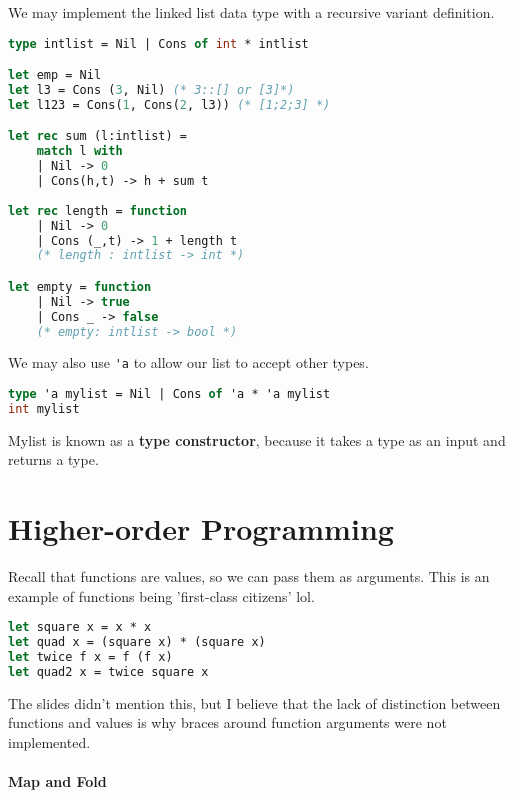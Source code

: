 \documentclass[12pt,a4paper]{article} %
\begin{document}
We may implement the linked list data type with a recursive variant definition.
\begin{lstlisting}[language=Caml]
type intlist = Nil | Cons of int * intlist

let emp = Nil
let l3 = Cons (3, Nil) (* 3::[] or [3]*)
let l123 = Cons(1, Cons(2, l3)) (* [1;2;3] *)

let rec sum (l:intlist) =
	match l with
	| Nil -> 0
	| Cons(h,t) -> h + sum t
	
let rec length = function
	| Nil -> 0
	| Cons (_,t) -> 1 + length t
	(* length : intlist -> int *)

let empty = function
	| Nil -> true
	| Cons _ -> false
	(* empty: intlist -> bool *)
\end{lstlisting}
We may also use \verb|'a| to allow our list to accept other types.
\begin{lstlisting}[language=Caml]
type 'a mylist = Nil | Cons of 'a * 'a mylist
int mylist
\end{lstlisting}
Mylist is known as a \textbf{type constructor}, because it takes a type as an input and returns a type.
\section{Higher-order Programming}
Recall that functions are values, so we can pass them as arguments. This is an example of functions being 'first-class citizens' lol.
\begin{lstlisting}[language=Caml]
let square x = x * x
let quad x = (square x) * (square x)
let twice f x = f (f x)
let quad2 x = twice square x
\end{lstlisting}
The slides didn't mention this, but I believe that the lack of distinction between functions and values is why braces around function arguments were not implemented.
\\\\
\textbf{Map and Fold}
\end{document}
